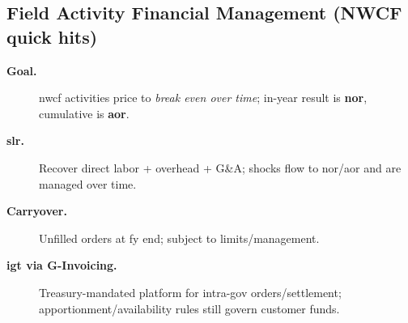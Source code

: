 \documentclass[../main.tex]{subfiles}
\begin{document}
\subsection{Field Activity Financial Management (NWCF quick hits)}
\begin{description}
  \item[\textbf{Goal.}] \ac{nwcf} activities price to \emph{break even over time}; in-year result is \textbf{\ac{nor}}, cumulative is \textbf{\ac{aor}}.
  \item[\textbf{\ac{slr}.}] Recover direct labor + overhead + G\&A; shocks flow to \ac{nor}/\ac{aor} and are managed over time.
  \item[\textbf{Carryover.}] Unfilled orders at \ac{fy} end; subject to limits/management.
  \item[\textbf{\ac{igt} via G-Invoicing.}] Treasury-mandated platform for intra-gov orders/settlement; apportionment/availability rules still govern customer funds.
\end{description}
\end{document}
